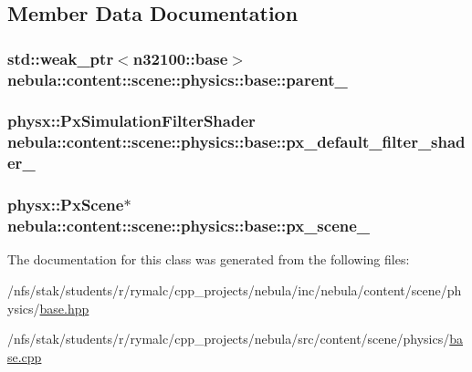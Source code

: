 \subsection{Member Data Documentation}
\hypertarget{classnebula_1_1content_1_1scene_1_1physics_1_1base_ac61fddd3f97a0f0589c70a363ea68d22}{
\subsubsection[{parent\_\-}]{\setlength{\rightskip}{0pt plus 5cm}std::weak\_\-ptr$<${\bf n32100::base}$>$ {\bf nebula::content::scene::physics::base::parent\_\-}}}
\label{classnebula_1_1content_1_1scene_1_1physics_1_1base_ac61fddd3f97a0f0589c70a363ea68d22}
\hypertarget{classnebula_1_1content_1_1scene_1_1physics_1_1base_a20237948f85598811a28a29c3a886f72}{
\subsubsection[{px\_\-default\_\-filter\_\-shader\_\-}]{\setlength{\rightskip}{0pt plus 5cm}physx::PxSimulationFilterShader {\bf nebula::content::scene::physics::base::px\_\-default\_\-filter\_\-shader\_\-}}}
\label{classnebula_1_1content_1_1scene_1_1physics_1_1base_a20237948f85598811a28a29c3a886f72}
\hypertarget{classnebula_1_1content_1_1scene_1_1physics_1_1base_af85fa3dbc4cdc266abcd21e33931b0a0}{
\subsubsection[{px\_\-scene\_\-}]{\setlength{\rightskip}{0pt plus 5cm}physx::PxScene$\ast$ {\bf nebula::content::scene::physics::base::px\_\-scene\_\-}}}
\label{classnebula_1_1content_1_1scene_1_1physics_1_1base_af85fa3dbc4cdc266abcd21e33931b0a0}


The documentation for this class was generated from the following files:\begin{DoxyCompactItemize}
\item 
/nfs/stak/students/r/rymalc/cpp\_\-projects/nebula/inc/nebula/content/scene/physics/\hyperlink{inc_2nebula_2content_2scene_2physics_2base_8hpp}{base.hpp}\item 
/nfs/stak/students/r/rymalc/cpp\_\-projects/nebula/src/content/scene/physics/\hyperlink{src_2content_2scene_2physics_2base_8cpp}{base.cpp}\end{DoxyCompactItemize}
